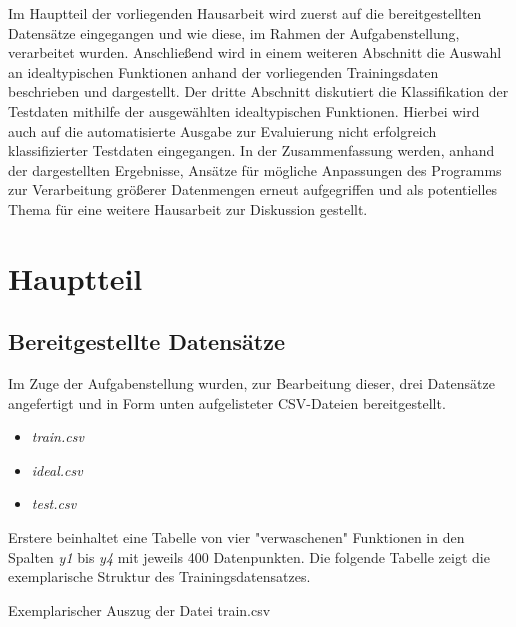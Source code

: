 Im Hauptteil der vorliegenden Hausarbeit wird zuerst auf die bereitgestellten Datensätze eingegangen und wie diese, im Rahmen der Aufgabenstellung, verarbeitet wurden.
Anschließend wird in einem weiteren Abschnitt die Auswahl an idealtypischen Funktionen anhand der vorliegenden Trainingsdaten beschrieben und dargestellt.
Der dritte Abschnitt diskutiert die Klassifikation der Testdaten mithilfe der ausgewählten idealtypischen Funktionen. Hierbei wird auch auf die automatisierte Ausgabe zur Evaluierung nicht erfolgreich klassifizierter Testdaten eingegangen.
In der Zusammenfassung werden, anhand der dargestellten Ergebnisse, Ansätze für mögliche Anpassungen des Programms zur Verarbeitung größerer Datenmengen erneut aufgegriffen und als potentielles Thema für eine weitere Hausarbeit zur Diskussion gestellt.

\chapter{Hauptteil}

\section{Bereitgestellte Datensätze}

Im Zuge der Aufgabenstellung wurden, zur Bearbeitung dieser, drei Datensätze angefertigt und in Form unten aufgelisteter CSV-Dateien bereitgestellt.

\begin{itemize}
 \itemsep0pt
 \item \emph{train.csv}
 \item \emph{ideal.csv}
 \item \emph{test.csv}
\end{itemize}

Erstere beinhaltet eine Tabelle von vier "verwaschenen" Funktionen in den Spalten \emph{y1} bis \emph{y4} mit jeweils 400 Datenpunkten. Die folgende Tabelle zeigt die exemplarische Struktur des Trainingsdatensatzes.

\begin{table}[H]
\small
\centering
{}
\caption{Exemplarischer Auszug der Datei train.csv}
\label{tab:train.csv}
\end{table} 


